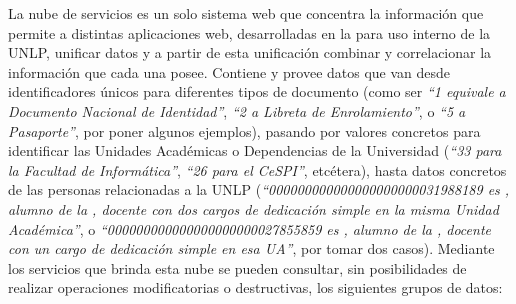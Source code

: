 La nube de servicios es un solo sistema web que concentra la información que permite a distintas aplicaciones web, desarrolladas en la \direccionDesarrollo para uso interno de la UNLP, unificar datos y a partir de esta unificación combinar y correlacionar la información que cada una posee. Contiene y provee datos que van desde identificadores únicos para diferentes tipos de documento (como ser \textit{“1 equivale a Documento Nacional de Identidad”}, \textit{“2 a Libreta de Enrolamiento”}, o \textit{“5 a Pasaporte”}, por poner algunos ejemplos), pasando por valores concretos para identificar las Unidades Académicas o Dependencias de la Universidad (\textit{“33 para la Facultad de Informática”}, \textit{“26 para el CeSPI”}, etcétera), hasta datos concretos de las personas relacionadas a la UNLP (\textit{“000000000000000000000031988189 es \nahuelcuesta, alumno de la \facultad, docente con dos cargos de dedicación simple en la misma Unidad Académica”}, o \textit{“000000000000000000000027855859 es \miguelcarbone, alumno de la \facultad, docente con un cargo de dedicación simple en esa UA”}, por tomar dos casos). Mediante los servicios que brinda esta nube se pueden consultar, sin posibilidades de realizar operaciones modificatorias o destructivas, los siguientes grupos de datos:

